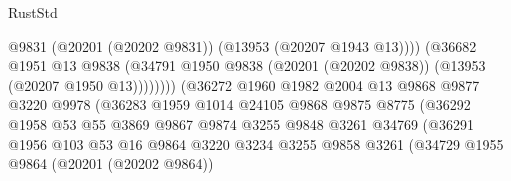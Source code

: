 \begin{lexlean}{RustStd}
\begin{coremodule}
                                              @9831
                                              (@20201 (@20202 @9831))
                                              (@13953 (@20207 @1943 @13))))
                                          (@36682
                                            @1951
                                            @13
                                            @9838
                                            (@34791
                                              @1950
                                              @9838
                                              (@20201 (@20202 @9838))
                                              (@13953 (@20207 @1950 @13))))))))
                                  (@36272
                                    @1960
                                    @1982
                                    @2004
                                    @13
                                    @9868
                                    @9877
                                    @3220
                                    @9978
                                    (@36283
                                      @1959
                                      @1014
                                      @24105
                                      @9868
                                      @9875
                                      @8775
                                      (@36292
                                        @1958
                                        @53
                                        @55
                                        @3869
                                        @9867
                                        @9874
                                        @3255
                                        @9848
                                        @3261
                                        @34769
                                        (@36291
                                          @1956
                                          @103
                                          @53
                                          @16
                                          @9864
                                          @3220
                                          @3234
                                          @3255
                                          @9858
                                          @3261
                                          (@34729
                                            @1955
                                            @9864
                                            (@20201 (@20202 @9864))

\end{coremodule}
\end{lexlean}
